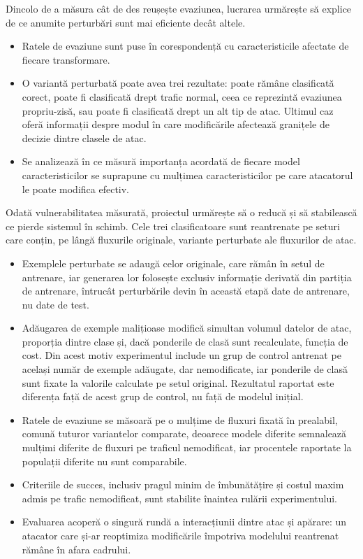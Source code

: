 \begin{description}[style=nextline]
\item[Obiectivul 5. Identificarea modificărilor care influențează cel mai mult decizia de detecție.]
Dincolo de a măsura cât de des reușește evaziunea, lucrarea urmărește să explice de ce anumite
perturbări sunt mai eficiente decât altele.
\begin{itemize}
    \item Ratele de evaziune sunt puse în corespondență cu caracteristicile afectate de fiecare
    transformare.
    \item O variantă perturbată poate avea trei rezultate: poate rămâne clasificată corect, poate
    fi clasificată drept trafic normal, ceea ce reprezintă evaziunea propriu-zisă, sau poate fi
    clasificată drept un alt tip de atac. Ultimul caz oferă informații despre modul în care
    modificările afectează granițele de decizie dintre clasele de atac.
    \item Se analizează în ce măsură importanța acordată de fiecare model caracteristicilor se
    suprapune cu mulțimea caracteristicilor pe care atacatorul le poate modifica efectiv.
\end{itemize}

\item[Obiectivul 6. Reducerea vulnerabilității identificate și măsurarea costului acestei reduceri.]
Odată vulnerabilitatea măsurată, proiectul urmărește să o reducă și să stabilească ce pierde
sistemul în schimb. Cele trei clasificatoare sunt reantrenate pe seturi care conțin, pe lângă
fluxurile originale, variante perturbate ale fluxurilor de atac.
\begin{itemize}
    \item Exemplele perturbate se adaugă celor originale, care rămân în setul de antrenare, iar
    generarea lor folosește exclusiv informație derivată din partiția de antrenare, întrucât
    perturbările devin în această etapă date de antrenare, nu date de test.
    \item Adăugarea de exemple malițioase modifică simultan volumul datelor de atac, proporția
    dintre clase și, dacă ponderile de clasă sunt recalculate, funcția de cost. Din acest motiv
    experimentul include un grup de control antrenat pe același număr de exemple adăugate, dar
    nemodificate, iar ponderile de clasă sunt fixate la valorile calculate pe setul original.
    Rezultatul raportat este diferența față de acest grup de control, nu față de modelul inițial.
    \item Ratele de evaziune se măsoară pe o mulțime de fluxuri fixată în prealabil, comună
    tuturor variantelor comparate, deoarece modele diferite semnalează mulțimi diferite de fluxuri
    pe traficul nemodificat, iar procentele raportate la populații diferite nu sunt comparabile.
    \item Criteriile de succes, inclusiv pragul minim de îmbunătățire și costul maxim admis pe
    trafic nemodificat, sunt stabilite înaintea rulării experimentului.
    \item Evaluarea acoperă o singură rundă a interacțiunii dintre atac și apărare: un atacator
    care și-ar reoptimiza modificările împotriva modelului reantrenat rămâne în afara cadrului.
\end{itemize}


\end{description}
